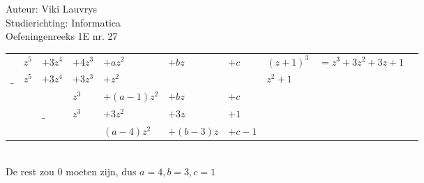 \documentclass[a4paper]{article}
\begin{document}
  
\noindent \large Auteur: Viki Lauvrys        \\
\noindent \large Studierichting: Informatica \\
\noindent \large Oefeningenreeks 1E nr. 27 \\

\medskip

\normalsize


\begin{tabular}{lllllll|lll}
		 &$z^5$ &$+3z^4$  & $+4z^3$  & $+az^2$      & $+bz$      & $+c$    & $(z+1)^3$  & $= z^3 + 3z^2 + 3z +1 $&	\\ \cline{8-10}
$\_$ &$z^5$	&$+3z^4$  & $+3z^3$  & $+z^2$       &            &         & $z^2 +1$ 	& 			 							 &	\\ \cline{2-5}
		 &			&        	& $z^3$    & $+(a-1)z^2$  & $+bz$      & $+c$    &        		&       	 						 &  \\
		 &			&  $\_$  	& $z^3$    & $+3z^2$      & $+3z$      & $+1$    &        		&       							 &  \\ \cline{4-7}
		 &			&        	&          & $(a-4)z^2$  	& $+(b-3)z$  & $+c-1$  &        		&       							 &  \\
\end{tabular}\\

De rest zou 0 moeten zijn, dus $a=4, b=3, c=1$\\

\begin{thebibliography}{999}
\end{thebibliography}
\end{document}
